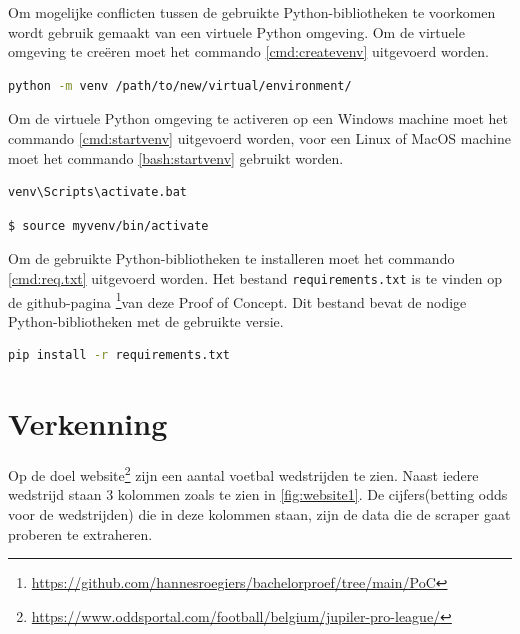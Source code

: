 Om mogelijke conflicten tussen de gebruikte Python-bibliotheken te voorkomen wordt gebruik gemaakt van een virtuele Python omgeving. Om de virtuele omgeving te creëren moet het commando \ref{cmd:createvenv} uitgevoerd worden.

\begin{lstlisting}[language=bash, label={cmd:createvenv}, caption={Het commando om een virtuele Python omgeving te creëren}]
    python -m venv /path/to/new/virtual/environment/
\end{lstlisting}
Om de virtuele Python omgeving te activeren op een Windows machine moet het commando \ref{cmd:startvenv} uitgevoerd worden, voor een Linux of MacOS machine moet het commando \ref{bash:startvenv} gebruikt worden.
\begin{lstlisting}[language=bash, label={cmd:startvenv}, caption={Het commando om een virtuele Python omgeving te activeren op een Windows machine}]
    venv\Scripts\activate.bat
\end{lstlisting}

\begin{lstlisting}[language=bash, label={bash:startvenv}, caption={Het commando om een virtuele Python omgeving te activeren op een Linux of MacOS machine}]
    $ source myvenv/bin/activate
\end{lstlisting}

Om de gebruikte Python-bibliotheken te installeren moet het commando \ref{cmd:req.txt} uitgevoerd worden. Het bestand \texttt{requirements.txt} is te vinden op de github-pagina \footnote{\url{https://github.com/hannesroegiers/bachelorproef/tree/main/PoC}}van deze Proof of Concept. Dit bestand bevat de nodige Python-bibliotheken met de gebruikte versie.
\begin{lstlisting}[language=bash, label={cmd:req.txt}, caption={Het commando om de nodige Python-bibliotheken te installeren}]
    pip install -r requirements.txt
\end{lstlisting}

\section{Verkenning}
Op de doel website\footnote{\url{https://www.oddsportal.com/football/belgium/jupiler-pro-league/}} zijn een aantal voetbal wedstrijden te zien. Naast iedere wedstrijd staan 3 kolommen zoals te zien in \ref{fig:website1}. De cijfers(betting odds voor de wedstrijden) die in deze kolommen staan, zijn de data die de scraper gaat proberen te extraheren.

